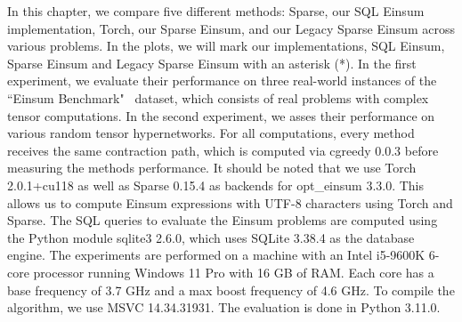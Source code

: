 
In this chapter, we compare five different methods: Sparse, our SQL Einsum implementation, Torch, our 
Sparse Einsum, and our Legacy Sparse Einsum across various problems. In the plots, we will mark
our implementations, SQL Einsum, Sparse Einsum and Legacy Sparse Einsum with an asterisk (*). In the
first experiment, we evaluate their performance on three real-world instances of the
``Einsum Benchmark"~\cite{einsum_benchmark} dataset, which consists of real problems with complex
tensor computations. In the second experiment, we asses their performance on various random tensor
hypernetworks. For all computations, every method receives the same contraction path, which is computed
via cgreedy 0.0.3 before measuring the methods performance. It should be noted that we use Torch 2.0.1+cu118 as well
as Sparse 0.15.4 as backends for opt\_einsum 3.3.0. This allows us to compute Einsum expressions with UTF-8 characters using Torch and Sparse. The SQL queries to evaluate the Einsum problems
are computed using the Python module sqlite3 2.6.0, which uses SQLite 3.38.4 as the database engine.
The experiments are performed on a machine with an Intel i5-9600K 6-core processor running Windows 11
Pro with 16 GB of RAM. Each core has a base frequency of 3.7 GHz and a max boost frequency of 4.6 GHz.
To compile the algorithm, we use MSVC 14.34.31931. The evaluation is done in Python 3.11.0.

